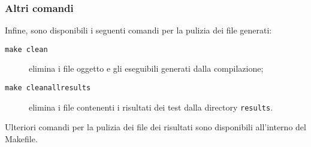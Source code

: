     \subsubsection*{Altri comandi}

        Infine, sono disponibili i seguenti comandi per la pulizia dei file generati:
        \begin{description}
            \item[\texttt{make clean}] elimina i file oggetto e gli eseguibili generati dalla compilazione;
            \item[\texttt{make cleanallresults}] elimina i file contenenti i risultati dei test dalla directory \texttt{results}.
        \end{description}

        Ulteriori comandi per la pulizia dei file dei risultati sono disponibili all'interno del Makefile.
